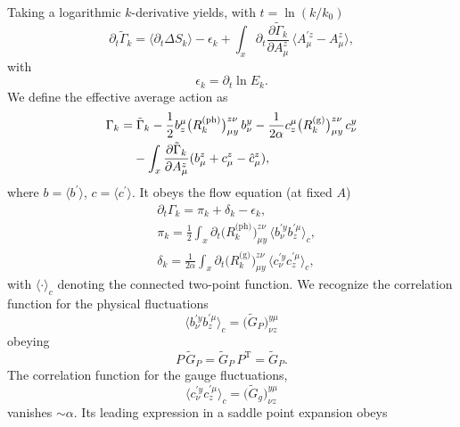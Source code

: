 \documentclass[twocolumn,aps,prd,amsmath,amssymb,preprintnumbers,longbibliography]{revtex4-1}
\numberwithin{equation}{section}
\newcommand{\transp}{\mathrm{T}}
\newenvironment{alignedeqn}{\begin{equation}\begin{aligned}}{\end{aligned}\end{equation}\ignorespacesafterend}
\begin{document}
\begin{appendices}
Taking a logarithmic $k$-derivative yields, with $t = \ln(k/k_0)$
\begin{equation}\label{eqn:FE3}
	\partial_t \tilde\Gamma_k
	= \langle\partial_t \Delta S_k\rangle - \epsilon_k + \int_x \partial_t \frac{\partial \tilde\Gamma_k}{\partial A_\mu^z} \, \langle A_\mu^{\prime z} - A_\mu^z\rangle,
\end{equation}
with
\begin{equation}\label{eqn:FE4}
	\epsilon_k
	= \partial_t \ln E_k.
\end{equation}
We define the effective average action as
\begin{align}\label{eqn:FE5}
	\Gamma_k
	&= \tilde\Gamma_k - \frac{1}{2} b_z^\mu \bigl(R_k^\text{(ph)}\bigr)_{\mu y}^{z \nu} \, b_\nu^y - \frac{1}{2 \alpha} c_z^\mu \bigl(R_k^\text{(g)}\bigr)_{\mu y}^{z \nu} \, c_\nu^y\notag\\
	&\hphantom{{}=}- \int_x \frac{\partial \tilde\Gamma_k}{\partial A_\mu^z} (b_\mu^z + c_\mu^z - \hat{c}_\mu^z),
\end{align}
where $b = \langle b^\prime\rangle$, $c = \langle c^\prime\rangle$. It obeys the flow equation (at fixed $A$)
\begin{alignedeqn}\label{eqn:FE6}
	&\partial_t \Gamma_k
	= \pi_k + \delta_k - \epsilon_k,\\
	&\pi_k
	= \frac{1}{2} \int_x \partial_t \bigl(R_k^\text{(ph)}\bigr)_{\mu y}^{z \nu} \, \langle b_\nu^{\prime y} b_z^{\prime \mu}\rangle_c,\\
	&\delta_k
	= \frac{1}{2 \alpha} \int_x \partial_t \bigl(R_k^\text{(g)}\bigr)_{\mu y}^{z \nu} \, \langle c_\nu^{\prime y} c_z^{\prime \mu}\rangle_c,
\end{alignedeqn}
with $\langle\cdot\rangle_c$ denoting the connected two-point function. We recognize the correlation function for the physical fluctuations
\begin{equation}\label{eqn:FE7}
	\langle b_\nu^{\prime y} b_z^{\prime \mu}\rangle_c
	= \bigl(\tilde{G}_P\bigr)_{\nu z}^{y \mu}
\end{equation}
obeying
\begin{equation}\label{eqn:FE8}
	P \, \tilde{G}_P
	= \tilde{G}_P \, P^\transp
	= \tilde{G}_P.
\end{equation}
The correlation function for the gauge fluctuations,
\begin{equation}\label{eqn:FE9}
	\langle c_\nu^{\prime y} c_z^{\prime \mu}\rangle_c
	= \bigl(\tilde{G}_g\bigr)_{\nu z}^{y \mu}
\end{equation}
vanishes $\sim \alpha$. Its leading expression in a saddle point expansion obeys

\end{appendices}
\end{document}
